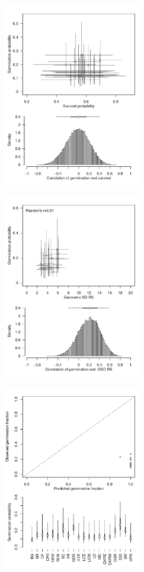 \documentclass[varwidth=\maxdimen,border=0pt]{standalone}
\begin{document}
    

\begin{figure}

    \begin{subfigure}{6cm}
        \centering
        \includegraphics[width=6cm]{../../figures/analysis/correlation-germ-surv.pdf} 
    \end{subfigure}%
    \begin{subfigure}{6cm}
        \centering
        \includegraphics[width=6cm]{../../figures/analysis/correlation-germ-rs.pdf} 
    \end{subfigure}
        \begin{subfigure}{6cm}
        \centering
        \includegraphics[width=6cm]{../../figures/analysis/obs-pred-germ.pdf} 
    \end{subfigure}
   \end{figure}
  
  
\end{document}
